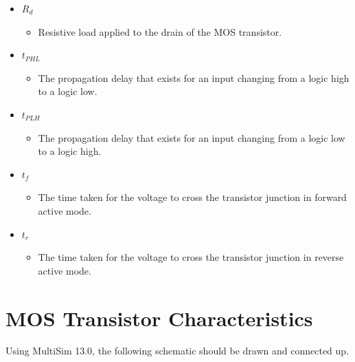 \documentclass[12pt]{article}
\begin{document}
\begin{itemize}
\item $R_{d}$
\begin{itemize}
\item Resistive load applied to the drain of the MOS transistor.
\end{itemize}
\item $t_{PHL}$
\begin{itemize}
\item The propagation delay that exists for an input changing from a logic high to a logic low.
\end{itemize}
\item $t_{PLH}$
\begin{itemize}
\item The propagation delay that exists for an input changing from a logic low to a logic high.
\end{itemize}
\item $t_{f}$
\begin{itemize}
\item The time taken for the voltage to cross the transistor junction in forward active mode.
\end{itemize}
\item $t_{r}$
\begin{itemize}
\item The time taken for the voltage to cross the transistor junction in reverse active mode.
\end{itemize}
\end{itemize}
\section{MOS Transistor Characteristics}
Using MultiSim 13.0, the following schematic should be drawn and connected up.
\end{document}
